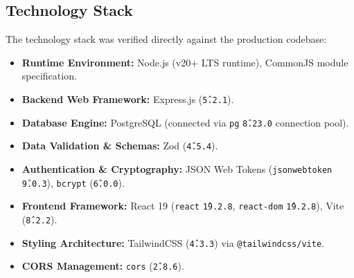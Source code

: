 \documentclass[conference]{IEEEtran}
\begin{document}
\subsection{Technology Stack}
The technology stack was verified directly against the production codebase:
\begin{itemize}
    \item \textbf{Runtime Environment:} Node.js (v20+ LTS runtime), CommonJS module specification.
    \item \textbf{Backend Web Framework:} Express.js (\texttt{\^5.2.1}).
    \item \textbf{Database Engine:} PostgreSQL (connected via \texttt{pg} \texttt{\^8.23.0} connection pool).
    \item \textbf{Data Validation \& Schemas:} Zod (\texttt{\^4.5.4}).
    \item \textbf{Authentication \& Cryptography:} JSON Web Tokens (\texttt{jsonwebtoken} \texttt{\^9.0.3}), \texttt{bcrypt} (\texttt{\^6.0.0}).
    \item \textbf{Frontend Framework:} React 19 (\texttt{react} \texttt{\^19.2.8}, \texttt{react-dom} \texttt{\^19.2.8}), Vite (\texttt{\^8.2.2}).
    \item \textbf{Styling Architecture:} TailwindCSS (\texttt{\^4.3.3}) via \texttt{@tailwindcss/vite}.
    \item \textbf{CORS Management:} \texttt{cors} (\texttt{\^2.8.6}).
\end{itemize}
\end{document}

